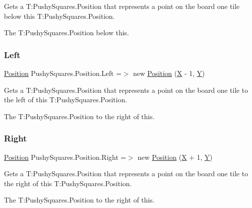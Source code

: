 Gets a T\+:\+Pushy\+Squares.\+Position that represents a point on the board one tile below this T\+:\+Pushy\+Squares.\+Position. 

The T\+:\+Pushy\+Squares.\+Position below this.\mbox{\label{struct_pushy_squares_1_1_position_a9918a40006026cdf9ff27f8e27932400}} 
\subsubsection{\texorpdfstring{Left}{Left}}
{\footnotesize\ttfamily \hyperlink{struct_pushy_squares_1_1_position}{Position} Pushy\+Squares.\+Position.\+Left =$>$ new \hyperlink{struct_pushy_squares_1_1_position}{Position} (\hyperlink{struct_pushy_squares_1_1_position_a35115084c01a6abc427fcebe771d6a87}{X} -\/ 1, \hyperlink{struct_pushy_squares_1_1_position_a976a349430fe3bdf57db6eb77f9b0b84}{Y})}



Gets a T\+:\+Pushy\+Squares.\+Position that represents a point on the board one tile to the left of this T\+:\+Pushy\+Squares.\+Position. 

The T\+:\+Pushy\+Squares.\+Position to the right of this.\mbox{\label{struct_pushy_squares_1_1_position_a76b2cd7dc03027afe757ea4f81336bba}} 
\subsubsection{\texorpdfstring{Right}{Right}}
{\footnotesize\ttfamily \hyperlink{struct_pushy_squares_1_1_position}{Position} Pushy\+Squares.\+Position.\+Right =$>$ new \hyperlink{struct_pushy_squares_1_1_position}{Position} (\hyperlink{struct_pushy_squares_1_1_position_a35115084c01a6abc427fcebe771d6a87}{X} + 1, \hyperlink{struct_pushy_squares_1_1_position_a976a349430fe3bdf57db6eb77f9b0b84}{Y})}



Gets a T\+:\+Pushy\+Squares.\+Position that represents a point on the board one tile to the right of this T\+:\+Pushy\+Squares.\+Position. 

The T\+:\+Pushy\+Squares.\+Position to the right of this.

